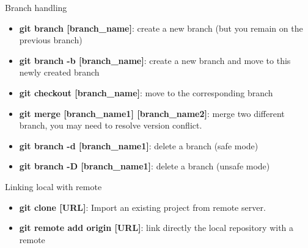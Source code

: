 \documentclass[10pt]{beamer}
\begin{document}
\begin{frame}{Branch handling}
    \begin{itemize}
        \item \textbf{git branch [branch\_name]}: create a new branch (but you remain on the previous branch)
        \item \textbf{git branch -b [branch\_name]}: create a new branch and move to this newly created branch
        \vspace{0.3cm}
        \item \textbf{git checkout [branch\_name]}: move to the corresponding branch
        \vspace{0.3cm}
        \item \textbf{git merge [branch\_name1] [branch\_name2]}: merge two different branch, you may need to resolve version conflict.
        \item \textbf{git branch -d [branch\_name1]}: delete a branch (safe mode)
        \item \textbf{git branch -D [branch\_name1]}: delete a branch (unsafe mode)
    
        
    \end{itemize}
\end{frame}


\begin{frame}{Linking local with remote}
    \begin{itemize}
        \item \textbf{git clone [URL]}: Import an existing project from remote server.
        \vspace{0.5cm}
        \item \textbf{git remote add origin [URL]}: link directly the local repository with a remote
    \end{itemize}
\end{frame}
\end{document}
